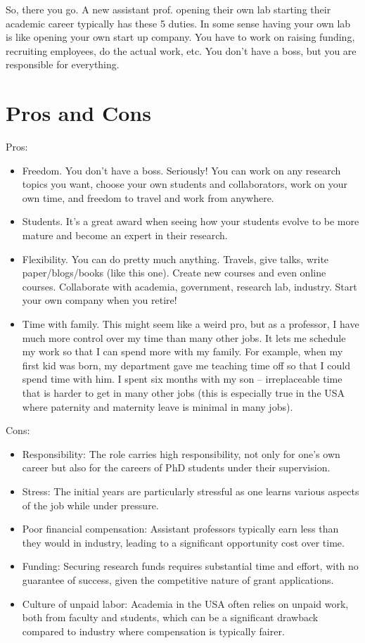 \documentclass[oneside,11pt,dvipsnames]{book}
\begin{document}
So, there you go. A new assistant prof. opening their own lab starting their academic career typically has these 5 duties.  In some sense having your own lab is like opening your own start up company. You have to work on raising funding, recruiting employees, do the actual work, etc.  You don't have a boss, but you are responsible for everything.  


\section{Pros and Cons}

Pros:
\begin{itemize}
\item Freedom. You don’t have a boss. Seriously! You can work on any research topics you want, choose your own students and collaborators, work on your own time, and freedom to travel and work from anywhere.

  \item Students. It's a great award when seeing how your students evolve to be more mature and become an expert in their research.

\item Flexibility. You can do pretty much anything.  Travels, give talks, write paper/blogs/books (like this one).  Create new courses and even online courses.  Collaborate  with academia, government, research lab, industry.  Start your own company when you retire!

\item Time with family. This might seem like a weird pro, but as a professor, I have much more
control over my time than many other jobs. It lets me schedule my work so that I can
spend more with my family. For example, when my ﬁrst kid was born, my department
gave me teaching time off so that I could spend time with him. I spent six months with
my son – irreplaceable time that is harder to get in many other jobs (this is especially
true in the USA where paternity and maternity leave is minimal in many jobs).
\end{itemize}

Cons:
\begin{itemize}
\item Responsibility: The role carries high responsibility, not only for one's own career but also for the careers of PhD students under their supervision.
\item Stress: The initial years are particularly stressful as one learns various aspects of the job while under pressure.
\item Poor financial compensation: Assistant professors typically earn less than they would in industry, leading to a significant opportunity cost over time.
\item Funding: Securing research funds requires substantial time and effort, with no guarantee of success, given the competitive nature of grant applications.
\item Culture of unpaid labor: Academia in the USA often relies on unpaid work, both from faculty and students, which can be a significant drawback compared to industry where compensation is typically fairer.
\end{itemize}
\end{document}
